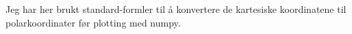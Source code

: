 \subsubsection{}

Jeg har her brukt standard-formler til å konvertere de kartesiske koordinatene til polarkoordinater før plotting med numpy.

\begin{figure}[H]
\centering

\caption{}
\end{figure}

\newpage




\newpage